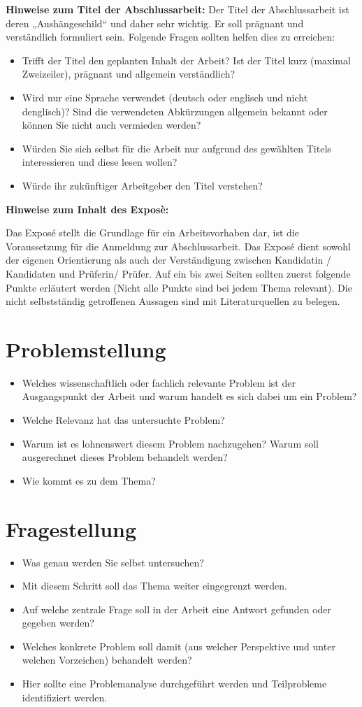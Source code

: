 \textbf{Hinweise zum Titel der Abschlussarbeit:}
Der Titel der Abschlussarbeit ist deren „Aushängeschild“ und daher sehr wichtig. Er soll prägnant und verständlich formuliert sein. Folgende Fragen sollten helfen dies zu erreichen:
\begin{itemize}
\item Trifft der Titel den geplanten Inhalt der Arbeit? Ist der Titel kurz (maximal Zweizeiler), prägnant und allgemein verständlich?
\item Wird nur eine Sprache verwendet (deutsch oder englisch und nicht denglisch)? Sind die verwendeten Abkürzungen allgemein bekannt oder können Sie nicht auch vermieden werden?
\item Würden Sie sich selbst für die Arbeit nur aufgrund des gewählten Titels interessieren und diese lesen wollen?
\item Würde ihr zukünftiger Arbeitgeber den Titel verstehen?
\end{itemize}
\textbf{Hinweise zum Inhalt des Exposè:}

Das Exposé stellt die Grundlage für ein Arbeitsvorhaben dar, ist die Voraussetzung für die
Anmeldung zur Abschlussarbeit. Das Exposé dient sowohl der eigenen Orientierung als auch der Verständigung zwischen
Kandidatin / Kandidaten und Prüferin/ Prüfer. Auf ein bis zwei Seiten sollten zuerst folgende Punkte erläutert werden (Nicht alle Punkte
sind bei jedem Thema relevant). Die nicht selbstständig getroffenen Aussagen sind mit Literaturquellen zu belegen.\cite{Mangold2003}
\section{Problemstellung}
\begin{itemize}
\item Welches wissenschaftlich oder fachlich relevante Problem ist der Ausgangspunkt der Arbeit und warum handelt es sich dabei um ein Problem?
\item Welche Relevanz hat das untersuchte Problem?
\item Warum ist es lohnenswert diesem Problem nachzugehen? Warum soll ausgerechnet dieses Problem behandelt werden?
\item Wie kommt es zu dem Thema?
\end{itemize}

\section{Fragestellung}
\begin{itemize}
\item Was genau werden Sie selbst untersuchen?
\item Mit diesem Schritt soll das Thema weiter eingegrenzt werden.
\item Auf welche zentrale Frage soll in der Arbeit eine Antwort gefunden oder gegeben werden?
\item Welches konkrete Problem soll damit (aus welcher Perspektive und unter welchen Vorzeichen) behandelt werden? 
\item Hier sollte eine Problemanalyse durchgeführt werden und Teilprobleme identifiziert werden.
\end{itemize}

